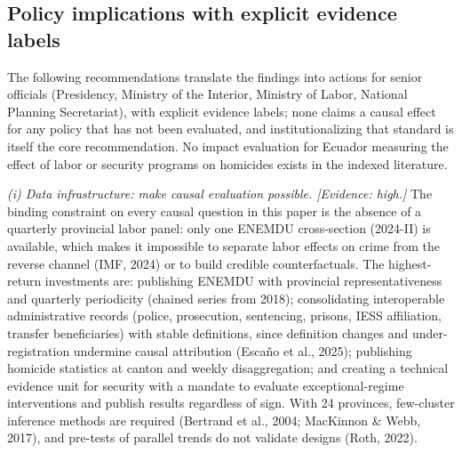 \subsection{Policy implications with explicit evidence labels}



The following recommendations translate the findings into actions for senior officials (Presidency, Ministry of the Interior, Ministry of Labor, National Planning Secretariat), with explicit evidence labels; none claims a causal effect for any policy that has not been evaluated, and institutionalizing that standard is itself the core recommendation. No impact evaluation for Ecuador measuring the effect of labor or security programs on homicides exists in the indexed literature.


\textit{(i) Data infrastructure: make causal evaluation possible. [Evidence: high.]} The binding constraint on every causal question in this paper is the absence of a quarterly provincial labor panel: only one ENEMDU cross-section (2024-II) is available, which makes it impossible to separate labor effects on crime from the reverse channel (IMF, 2024) or to build credible counterfactuals. The highest-return investments are: publishing ENEMDU with provincial representativeness and quarterly periodicity (chained series from 2018); consolidating interoperable administrative records (police, prosecution, sentencing, prisons, IESS affiliation, transfer beneficiaries) with stable definitions, since definition changes and under-registration undermine causal attribution (Escaño et al., 2025); publishing homicide statistics at canton and weekly disaggregation; and creating a technical evidence unit for security with a mandate to evaluate exceptional-regime interventions and publish results regardless of sign. With 24 provinces, few-cluster inference methods are required (Bertrand et al., 2004; MacKinnon \& Webb, 2017), and pre-tests of parallel trends do not validate designs (Roth, 2022).


